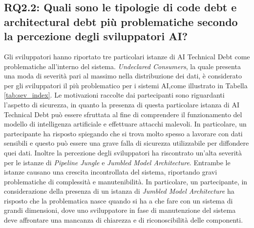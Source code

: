 \subsection{RQ2.2: Quali sono le tipologie di code debt e architectural debt più problematiche secondo la percezione degli sviluppatori AI?}

Gli sviluppatori hanno riportato tre particolari istanze di AI Technical Debt come problematiche all'interno del sistema. 
\textit{Undeclared Consumers}, la quale presenta una moda di severità pari al massimo nella distribuzione dei dati, è considerato per gli sviluppatori il più problematico per i sistemi AI,come illustrato in Tabella \ref{tab:sev_index}.
Le motivazioni raccolte dai partecipanti sono riguardanti l'aspetto di sicurezza, in quanto la presenza di questa particolare istanza di AI Technical Debt può essere sfruttata al fine di comprendere il funzionamento del modello di intelligenza artificiale e effettuare attacchi malevoli.
In particolare, un partecipante ha risposto spiegando che si trova molto spesso a lavorare con dati sensibili e questo può essere una grave falla di sicurezza utilizzabile per diffondere quei dati.
Inoltre la percezione degli sviluppatori ha riscontrato un'alta severità per le istanze di \textit{Pipeline Jungle} e \textit{Jumbled Model Architecture}.
Entrambe le istanze causano una crescita incontrollata del sistema, riportando gravi problematiche di complessità e manutenibilità.
In particolare, un partecipante, in considerazione della presenza di un istanza di \textit{Jumbled Model Architecture} ha risposto che la problematica nasce quando si ha a che fare con un sistema di grandi dimensioni, dove uno sviluppatore in fase di manutenzione del sistema deve affrontare una mancanza di chiarezza e di riconoscibilità delle componenti.

